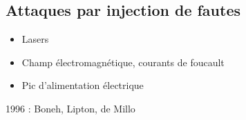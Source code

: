         \subsection{Attaques par injection de fautes}
            \begin{itemize}
                \item Lasers
                \item Champ électromagnétique, courants de foucault
                \item Pic d'alimentation électrique
            \end{itemize}
            1996 : Boneh, Lipton, de Millo